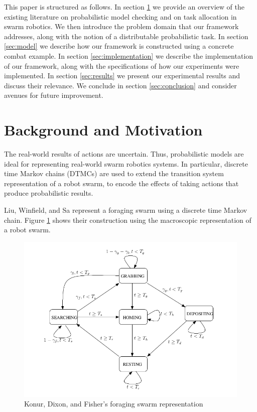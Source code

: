 \documentclass[11pt]{article}
\theoremstyle{definition}
\begin{document}
This paper is structured as follows.
%
In section \ref{sec:background-motivation} we provide an overview of the
existing literature on probabilistic model checking and on task allocation in
swarm robotics.
We then introduce the problem domain that our framework addresses, along with
the notion of a distributable probabilistic task.
%
In section \ref{sec:model} we describe how our framework is constructed using a
concrete combat example.
%
In section \ref{sec:implementation} we describe the implementation of our
framework, along with the specifications of how our experiments were
implemented.
%
In section \ref{sec:results} we present our experimental results and discuss
their relevance.
%
We conclude in section \ref{sec:conclusion} and consider avenues for future
improvement.

\section{Background and Motivation}
\label{sec:background-motivation}

The real-world results of actions are uncertain. Thus,
probabilistic models are ideal for representing
real-world swarm robotics systems.
In particular, discrete time Markov chains (DTMCs)
are used to extend the transition system representation
of a robot swarm, to encode the effects of taking actions
that produce probabilistic results.

Liu, Winfield, and Sa represent a foraging swarm
using a discrete time Markov chain. Figure \ref{fig:foraging}
shows their construction using the macroscopic
representation of a robot swarm.

\begin{figure}
    \caption{Konur, Dixon, and Fisher's foraging swarm representation}
    \label{fig:foraging}
    \includegraphics[width=\textwidth]{foraging.png}
\end{figure}
\end{document}
